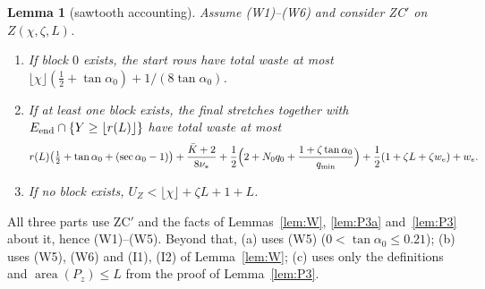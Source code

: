 \documentclass[11pt]{amsart}
\newcommand{\taz}{\tan\alpha_0}
\newcommand{\sez}{\sec\alpha_0}
\newcommand{\Kb}{\bar K}
\newtheorem{lemma}[theorem]{Lemma}
\theoremstyle{definition}
\theoremstyle{remark}
\numberwithin{equation}{section}
\begin{document}
\begin{lemma}[sawtooth accounting]\label{lem:T1}
Assume (W1)--(W6) and consider ZC$'$ on $Z(\chi,\zeta,L)$.
\begin{enumerate}[label=(\alph*)]
\item If block $0$ exists, the start rows have total waste at most $\lfloor\chi\rfloor(\frac12+\taz)+1/(8\taz)$.
\item If at least one block exists, the final stretches together with $E_{\rm end}\cap\{Y\ge\lfloor r(L)\rfloor\}$ have total
waste at most
\[
r(L)\bigl(\tfrac12+\taz+(\sez-1)\bigr)+\frac{\Kb+2}{8\nu_*}+\frac12\Bigl(2+N_0q_0+\frac{1+\zeta\taz}{q_{\min}}\Bigr)
+\frac12(1+\zeta L+\zeta w_e)+w_e .
\]
\item If no block exists, $U_Z<\lfloor\chi\rfloor+\zeta L+1+L$.
\end{enumerate}
\end{lemma}

All three parts use ZC$'$ and the facts of Lemmas~\ref{lem:W}, \ref{lem:P3a} and~\ref{lem:P3} about it, hence (W1)--(W5).
Beyond that, (a) uses (W5) ($0<\taz\le0.21$); (b) uses (W5), (W6) and (I1), (I2) of Lemma~\ref{lem:W}; (c) uses only
the definitions and $\operatorname{area}(P_z)\le L$ from the proof of Lemma~\ref{lem:P3}.
\end{document}
